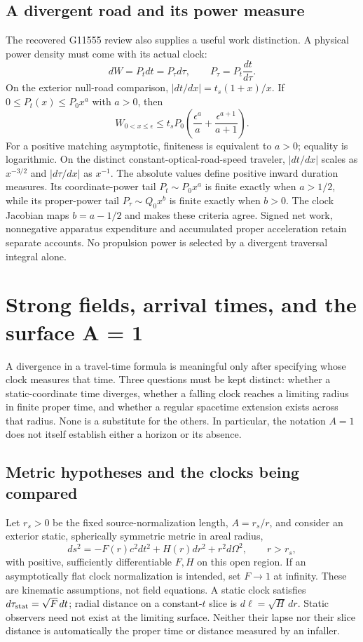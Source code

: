 \documentclass[10pt,twocolumn,letterpaper]{article}
\begin{document}
\subsection{A divergent road and its power measure}
The recovered G11555 review also supplies a useful work distinction.
A physical power density must come with its actual clock:
\[
 dW=P_tdt=P_\tau d\tau,\qquad
 P_\tau=P_t\frac{dt}{d\tau}.
\]
On the exterior null-road comparison,
$|dt/dx|=t_s(1+x)/x$. If $0\le P_t(x)\le P_0x^a$ with $a>0$, then
\[
 W_{0<x\le\epsilon}\le t_sP_0
 \left(\frac{\epsilon^a}{a}
       +\frac{\epsilon^{a+1}}{a+1}\right).
\]
For a positive matching asymptotic, finiteness is equivalent to $a>0$;
equality is logarithmic. On the distinct constant-optical-road-speed
traveler, $|dt/dx|$ scales as $x^{-3/2}$ and $|d\tau/dx|$ as $x^{-1}$. The absolute values define positive inward duration measures.
Its coordinate-power tail $P_t\sim P_0x^a$ is finite exactly when
$a>1/2$, while its proper-power tail $P_\tau\sim Q_0x^b$ is finite
exactly when $b>0$. The clock Jacobian maps $b=a-1/2$ and makes these
criteria agree. Signed net work, nonnegative apparatus expenditure and
accumulated proper acceleration retain separate accounts. No propulsion
power is selected by a divergent traversal integral alone.


\section{Strong fields, arrival times, and the surface A = 1}
\label{sec:ch5-arrival}

A divergence in a travel-time formula is meaningful only after specifying
whose clock measures that time. Three questions must be kept distinct:
whether a static-coordinate time diverges, whether a falling clock reaches
a limiting radius in finite proper time, and whether a regular spacetime
extension exists across that radius. None is a substitute for the others.
In particular, the notation $A=1$ does not itself establish either a horizon
or its absence.

\subsection{Metric hypotheses and the clocks being compared}
Let $r_s>0$ be the fixed source-normalization length, $A=r_s/r$, and consider
an exterior static, spherically symmetric metric in areal radius,
\begin{equation}
 ds^2=-F(r)c^2dt^2+H(r)dr^2+r^2d\Omega^2,\qquad r>r_s,
 \label{eq:ch5-general-static}
\end{equation}
with positive, sufficiently differentiable $F,H$ on this open region.
If an asymptotically flat clock normalization is intended, set $F\to1$
at infinity. These are kinematic assumptions, not field equations.
A static clock satisfies $d\tau_{\rm stat}=\sqrt F\,dt$; radial distance
on a constant-$t$ slice is $d\ell=\sqrt H\,dr$. Static observers need not
exist at the limiting surface. Neither their lapse nor their slice distance
is automatically the proper time or distance measured by an infaller.
\end{document}
